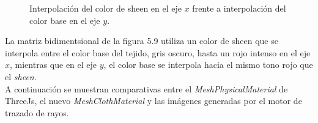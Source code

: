 


\begin{figure}[H]
  \vspace{0.5cm}
  \centering
    \caption{Interpolaci\'on del color de sheen en el eje $x$ frente a interpolaci\'on del color base en el eje $y$.}
\end{figure}

La matriz bidimentsional de la figura 5.9 utiliza un color de sheen que se interpola entre el color base del tejido,
gris oscuro, hasta un rojo intenso en el eje $x$, mientras que en el eje $y$, el color base se interpola hacia el mismo
tono rojo que el \textit{sheen}.\\

\singlespacing
A continuaci\'on se muestran comparativas entre el \textit{MeshPhysicalMaterial} de ThreeJs, el nuevo \textit{MeshClothMaterial}
y las im\'agenes generadas por el motor de trazado de rayos.

